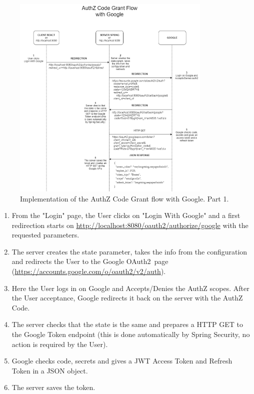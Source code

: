 \documentclass[a4paper,12pt]{article}
\def\oauth{OAuth2\xspace}
\begin{document}
\begin{figure}[ht]
    \centering
    \includegraphics[width=0.85\textwidth]{figures/flow_google1.png}
    \caption{Implementation of the AuthZ Code Grant flow with Google. Part 1.}
    \label{fig:google1}
\end{figure}

\begin{enumerate}
    \item From the "Login" page, the User clicks on "Login With Google" and a first redirection starts on \url{http://localhost:8080/oauth2/authorize/google} with the requested parameters.
    \item The server creates the state parameter, takes the info from the configuration and redirects the User to the Google \oauth\ page (\url{https://accounts.google.com/o/oauth2/v2/auth}).
    \item Here the User logs in on Google and Accepts/Denies the AuthZ scopes. After the User acceptance, Google redirects it back on the server with the AuthZ Code.
    \item The server checks that the state is the same and prepares a HTTP GET to the Google Token endpoint (this is done automatically by Spring Security, no action is required by the User).
    \item Google checks code, secrets and gives a JWT Access Token and Refresh Token in a JSON object.
    \item The server saves the token.
\end{enumerate}
\end{document}

